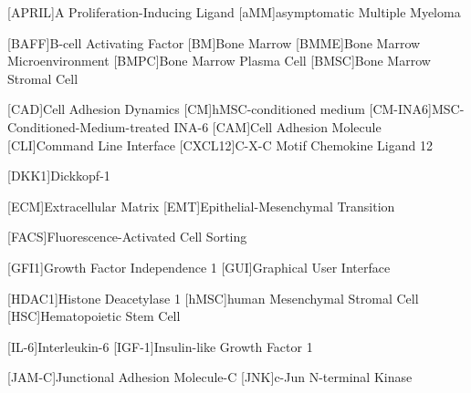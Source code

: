 
%
\vspace{-\vfull}
\label{sec:Abbreviations}%
{%
    \footnotesize%
    \begin{spacing}{-.0}%
        \begin{acronym}%
            [APRIL]{A Proliferation-Inducing Ligand} %
            [aMM]{asymptomatic Multiple Myeloma}

            [BAFF]{B-cell Activating Factor}
            [BM]{Bone Marrow}
            [BMME]{Bone Marrow Microenvironment}
            [BMPC]{Bone Marrow Plasma Cell}
            [BMSC]{Bone Marrow Stromal Cell}

            [CAD]{Cell Adhesion Dynamics}
            [CM]{hMSC-conditioned medium}
            [CM-INA6]{MSC-Conditioned-Medium-treated INA-6}
            [CAM]{Cell Adhesion Molecule}
            [CLI]{Command Line Interface}
            [CXCL12]{C-X-C Motif Chemokine Ligand 12}

            [DKK1]{Dickkopf-1}

            [ECM]{Extracellular Matrix}
            [EMT]{Epithelial-Mesenchymal Transition}

            [FACS]{Fluorescence-Activated Cell Sorting}

            [GFI1]{Growth Factor Independence 1}
            [GUI]{Graphical User Interface}

            [HDAC1]{Histone Deacetylase 1}
            [hMSC]{human Mesenchymal Stromal Cell}
            [HSC]{Hematopoietic Stem Cell}

            [IL-6]{Interleukin-6}
            [IGF-1]{Insulin-like Growth Factor 1}

            [JAM-C]{Junctional Adhesion Molecule-C}
            [JNK]{c-Jun N-terminal Kinase}
            

\end{acronym}
\end{spacing}}
